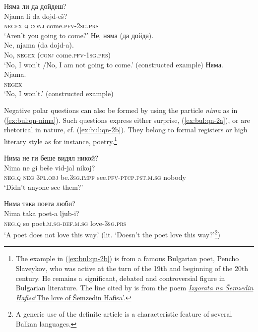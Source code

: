 \documentclass[output=paper,colorlinks=true, citecolor=brown]{langscibook}
\begin{document}
\ea\label{ex:bul:qn-1c}
    \begin{xlist}[B1: ]
     Няма ли да дойдеш? \\
        \gll Njama li da dojd-eš? \\ 
             \textsc{negex} \textsc{q} \textsc{conj} come.\textsc{pfv}-\textsc{2sg.prs} \\ 
        \glt `Aren't you going to come?'
     Не, няма (да дойда).\\
        \gll Ne, njama (da dojd-a). \\ 
             No, \textsc{negex} (\textsc{conj} come.\textsc{pfv}-\textsc{1sg.prs}) \\
        \glt `No, I won't \slash No, I am not going to come.' (constructed example)
  Няма.\\
        \gll Njama. \\ 
             \textsc{negex} \\
        \glt `No, I won't.' (constructed example)
    \end{xlist}
\z 
Negative polar questions can also be formed by using the particle \textit{nima} as in (\ref{ex:bul:qn-nima}). Such questions express either surprise, (\ref{ex:bul:qn-2a}), or are rhetorical in nature, cf. (\ref{ex:bul:qn-2b}). They belong to formal registers or high literary style as for instance, poetry.\footnote{The example in (\ref{ex:bul:qn-2b}) is from a famous Bulgarian poet, Pencho Slaveykov, who was active at the turn of the 19th and beginning of the 20th century. He remains a significant, debated and controversial figure in Bulgarian literature. The line cited by \citet{PopovEtAl1983Synt} is from the poem \href{https://chitanka.info/text/36978-izgorata-na-shemzedin-hafisa}{\textit{Izgorata na Šemzedin Hafisa}`The love of Šemzedin Hafisa'}.}

\ea \label{ex:bul:qn-nima} 
  \ea Нима не ги беше видял никой?\label{ex:bul:qn-2a}\\ 
  	\gll Nima ne gi beše vid-jal nikoj?\\
     \textsc{neg.q} \textsc{neg} \textsc{3pl.obj} be.\textsc{3sg.impf} see.\textsc{pfv}-\textsc{ptcp.pst.m.sg} nobody\\
\glt `Didn't anyone see them?' \citep[46]{PopovEtAl1983Synt}

\newpage
\ex Нима така поета люби?  \label{ex:bul:qn-2b}\\
	\gll Nima taka poet-a ljub-i?\\
     \textsc{neg.q} so poet.\textsc{m.sg}-\textsc{def.m.sg} love-\textsc{3sg.prs}\\
\glt `A poet does not love this way.' (lit. `Doesn't the poet love this way?'\footnote{A generic use of the definite article is a characteristic feature of several Balkan languages.}) \citep[46]{PopovEtAl1983Synt}
\z \z
\end{document}
